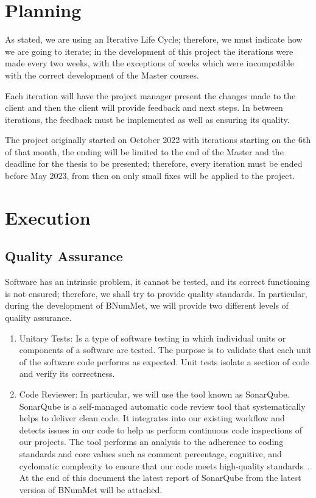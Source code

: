 \section{Planning}
As stated, we are using an Iterative Life Cycle; therefore, we must indicate how we are going to iterate; in the development of this project the iterations were made every two weeks, with the exceptions of weeks which were incompatible with the correct development of the Master courses.

Each iteration will have the project manager present the changes made to the client and then the client will provide feedback and next steps. In between iterations, the feedback must be implemented as well as ensuring its quality.

The project originally started on October 2022 with iterations starting on the 6th of that month, the ending will be limited to the end of the Master and the deadline for the thesis to be presented; therefore, every iteration must be ended before May 2023, from then on only small fixes will be applied to the project.

\section{Execution}
\subsection{Quality Assurance}
Software has an intrinsic problem, it cannot be tested, and its correct functioning is not ensured; therefore, we shall try to provide quality standards. In particular, during the development of BNumMet, we will provide two different levels of quality assurance.
\begin{enumerate}
    \item Unitary Tests: Is a type of software testing in which individual units or components of a software are tested. The purpose is to validate that each unit of the software code performs as expected.  Unit tests isolate a section of code and verify its correctness. 
    
    \item Code Reviewer: In particular, we will use the tool known as SonarQube. SonarQube is a self-managed automatic code review tool that systematically helps to deliver clean code. It integrates into our existing workflow and detects issues in our code to help us perform continuous code inspections of our projects. The tool performs an analysis to the adherence to coding standards and core values such as comment percentage, cognitive, and cyclomatic complexity to ensure that our code meets high-quality standards~\cite{sonarsource, sonarqube}. At the end of this document the latest report of SonarQube from the latest version of BNumMet will be attached.
\end{enumerate}


